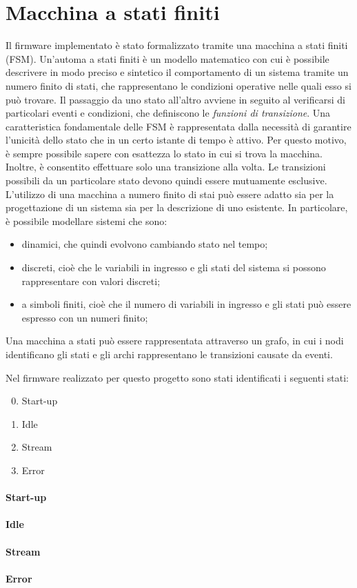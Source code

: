 \section{Macchina a stati finiti}
Il firmware implementato è stato formalizzato tramite una macchina a stati finiti (FSM). Un'automa a stati finiti è un modello matematico con cui è possibile descrivere in modo preciso e sintetico il comportamento di un sistema tramite un numero finito di stati, che rappresentano le condizioni operative nelle quali esso si può trovare. Il passaggio da uno stato all'altro avviene in seguito al verificarsi di particolari eventi e condizioni, che definiscono le \textit{funzioni di transizione}. Una caratteristica fondamentale delle FSM è rappresentata dalla necessità di garantire l'unicità dello stato che in un certo istante di tempo è attivo. Per questo motivo, è sempre possibile sapere con esattezza lo stato in cui si trova la macchina. Inoltre, è consentito effettuare solo una transizione alla volta. Le transizioni possibili da un particolare stato devono quindi essere mutuamente esclusive.
L'utilizzo di una macchina a numero finito di stai può essere adatto sia per la progettazione di un sistema sia per la descrizione di uno esistente. In particolare, è possibile modellare sistemi che sono:
\begin{itemize}
	\item dinamici, che quindi evolvono cambiando stato nel tempo;
	\item discreti, cioè che le variabili in ingresso e gli stati del sistema si possono rappresentare con valori discreti;
	\item a simboli finiti, cioè che il numero di variabili in ingresso e gli stati può essere espresso con un numeri finito;
\end{itemize}
Una macchina a stati può essere rappresentata attraverso un grafo, in cui i nodi identificano gli stati e gli archi rappresentano le transizioni causate da eventi. 

Nel firmware realizzato per questo progetto sono stati identificati i seguenti stati:
\begin{enumerate}
	\setcounter{enumi}{-1}
	\item Start-up
	\item Idle
	\item Stream
	\item Error
\end{enumerate}


\paragraph{Start-up}
\paragraph{Idle}
\paragraph{Stream}
\paragraph{Error}

\clearpage